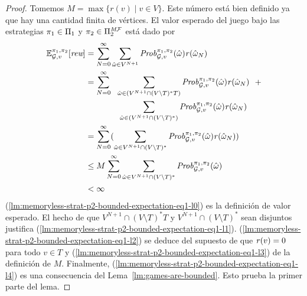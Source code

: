 \begin{proof}
  Tomemos $M = \max \{r(v) \mid v \in V\}$.  Este número está bien definido ya que
  hay una cantidad finita de vértices.
  El valor esperado del juego bajo las estrategias
  $\pi_{1} \in \Pi_{1}$ y $\pi_{2} \in \Pi^{\textit{M}\mathcal{F}}_{2}$
  está dado por
  \begin{align}	
    \label{lm:memoryless-strat-p2-bounded-expectation-eq1-l0}
    \mathbb{E}^{\pi_{1}, \pi_{2}}_{\mathcal{G},v}[\textit{rew}]
    & = \sum^{\infty}_{N=0} \sum_{\hat{\omega} \in V^{N+1}} \mathit{Prob}^{\pi_{1}, \pi_{2}}_{\mathcal{G},v}(\hat{\omega})\mathit{r}(\hat{\omega}_N) \\
    \label{lm:memoryless-strat-p2-bounded-expectation-eq1-l1}	
    & = \sum^{\infty}_{N=0} \ \ \sum_{\hat{\omega} \in (V^{N+1} \cap (V \setminus T)^*T)} \mathit{Prob}^{\pi_{1}, \pi_{2}}_{\mathcal{G},v}(\hat{\omega})  \mathit{r}(\hat{\omega}_N) \ \ + \notag\\
    &\hspace*{4em} \sum_{\hat{\omega} \in (V^{N+1} \cap (V \setminus T)^*)} \mathit{Prob}^{\pi_{1}, \pi_{2}}_{\mathcal{G},v}(\hat{\omega}) \mathit{r}(\hat{\omega}_N)   \\
    \label{lm:memoryless-strat-p2-bounded-expectation-eq1-l2}
    & =  \sum^{\infty}_{N=0}  (\sum_{\hat{\omega} \in V^{N+1} \cap (V \setminus T)^*} \mathit{Prob}^{\pi_{1}, \pi_{2}}_{\mathcal{G},v}(\hat{\omega}) \mathit{r}(\hat{\omega}_N) ) \\
    \label{lm:memoryless-strat-p2-bounded-expectation-eq1-l3}
    & \leq M \sum^{\infty}_{N=0}  \sum_{\hat{\omega} \in V^{N+1} \cap (V \setminus T)^*} \mathit{Prob}^{\pi_{1}, \pi_{2}}_{\mathcal{G},v}(\hat{\omega})  \\
    \label{lm:memoryless-strat-p2-bounded-expectation-eq1-l4}
    & < \infty 
  \end{align}
  (\ref{lm:memoryless-strat-p2-bounded-expectation-eq1-l0}) es la
  definición de valor esperado.
  El hecho de que $V^{N+1} \cap (V \setminus T)^*T$ y
  $V^{N+1} \cap (V \setminus T)^*$ sean disjuntos justifica
  (\ref{lm:memoryless-strat-p2-bounded-expectation-eq1-l1}).
  (\ref{lm:memoryless-strat-p2-bounded-expectation-eq1-l2}) se deduce
  del supuesto de que $\mathit{r}(v) = 0$ para todo $v \in T$ y
  (\ref{lm:memoryless-strat-p2-bounded-expectation-eq1-l3}) de la
  definición de $M$.
  Finalmente, (\ref{lm:memoryless-strat-p2-bounded-expectation-eq1-l4})
  es una consecuencia del Lema~\ref{lm:games-are-bounded}.
  Esto prueba la primer parte del lema.


\end{proof}
